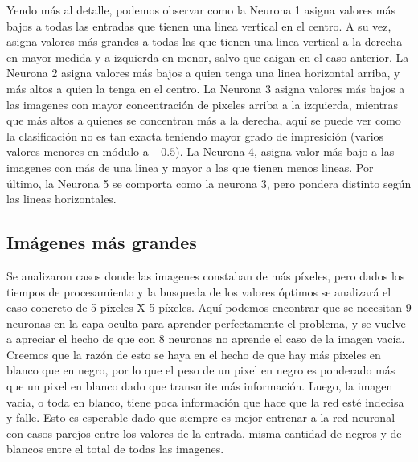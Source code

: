 \documentclass[12pt]{article}
\begin{document}
Yendo más al detalle, podemos observar como la Neurona 1 asigna valores más bajos a todas las entradas que tienen una linea vertical en el centro. A su vez, asigna valores más grandes a todas las que tienen una linea vertical a la derecha en mayor medida y a izquierda en menor, salvo que caigan en el caso anterior. La Neurona 2 asigna valores más bajos a quien tenga una linea horizontal arriba, y más altos a quien la tenga en el centro. La Neurona 3 asigna valores más bajos a las imagenes con mayor concentración de pixeles arriba a la izquierda, mientras que más altos a quienes se concentran más a la derecha, aquí se puede ver como la clasificación no es tan exacta teniendo mayor grado de impresición (varios valores menores en módulo a $-0.5$). La Neurona 4, asigna valor más bajo a las imagenes con más de una linea y mayor a las que tienen menos lineas. Por último, la Neurona 5 se comporta como la neurona 3, pero pondera distinto según las lineas horizontales. 

\subsection{Imágenes más grandes}

Se analizaron casos donde las imagenes constaban de más píxeles, pero dados los tiempos de procesamiento y la busqueda de los valores óptimos se analizará el caso concreto de 5 píxeles X 5 píxeles. Aquí podemos encontrar que se necesitan 9 neuronas en la capa oculta para aprender perfectamente el problema, y se vuelve a apreciar el hecho de que con 8 neuronas no aprende el caso de la imagen vacía. Creemos que la razón de esto se haya en el hecho de que hay más pixeles en blanco que en negro, por lo que el peso de un pixel en negro es ponderado más que un pixel en blanco dado que transmite más información. Luego, la imagen vacia, o toda en blanco, tiene poca información que hace que la red esté indecisa y falle. Esto es esperable dado que siempre es mejor entrenar a la red neuronal con casos parejos entre los valores de la entrada, misma cantidad de negros y de blancos entre el total de todas las imagenes.
\end{document}
